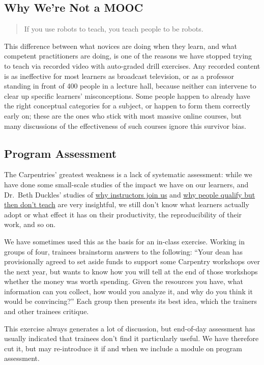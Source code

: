 \subsection{Why We're Not a MOOC}\label{why-were-not-a-mooc}

\begin{quote}
If you use robots to teach, you teach people to be robots.
\end{quote}

This difference between what novices are doing when they learn, and what
competent practitioners are doing, is one of the reasons we have stopped
trying to teach via recorded video with auto-graded drill exercises. Any
recorded content is as ineffective for most learners as broadcast
television, or as a professor standing in front of 400 people in a
lecture hall, because neither can intervene to clear up specific
learners' misconceptions. Some people happen to already have the right
conceptual categories for a subject, or happen to form them correctly
early on; these are the ones who stick with most massive online courses,
but many discussions of the effectiveness of such courses ignore this
survivor bias.

\subsection{Program Assessment}\label{program-assessment}

The Carpentries' greatest weakness is a lack of systematic assessment:
while we have done some small-scale studies of the impact we have on our
learners, and Dr.~Beth Duckles' studies of
\href{\{\{\%20site.swc\_site\%20\}\}/files/bib/duckles-instructor-engagement-2016.pdf}{why
instructors join us} and
\href{\{\{\%20site.swc\_site\%20\}\}/files/bib/duckles-non-instructor-report-2016.pdf}{why
people qualify but then don't teach} are very insightful, we still don't
know what learners actually adopt or what effect it has on their
productivity, the reproducibility of their work, and so on.

We have sometimes used this as the basis for an in-class exercise.
Working in groups of four, trainees brainstorm answers to the following:
``Your dean has provisionally agreed to set aside funds to support some
Carpentry workshops over the next year, but wants to know how you will
tell at the end of those workshops whether the money was worth spending.
Given the resources you have, what information can you collect, how
would you analyze it, and why do you think it would be convincing?''
Each group then presents its best idea, which the trainers and other
trainees critique.

This exercise always generates a lot of discussion, but end-of-day
assessment has usually indicated that trainees don't find it
particularly useful. We have therefore cut it, but may re-introduce it
if and when we include a module on program assessment.
